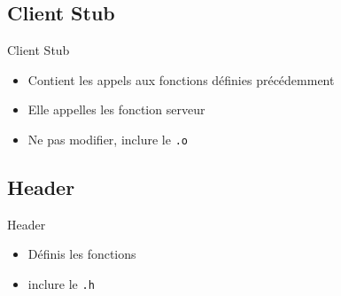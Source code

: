 \subsection{\sectitle}
\begin{frame}[containsverbatim]{\sectitle}
    \def\subsectitle{Client Stub}
    \subsection{\subsectitle}
    \begin{block}{\subsectitle}
        \begin{itemize}
            \item Contient les appels aux fonctions définies précédemment
            \item Elle appelles les fonction serveur
            \item Ne pas modifier, inclure le \verb+.o+
        \end{itemize}
    \end{block}
    \def\subsectitle{Header}
    \subsection{\subsectitle}
    \begin{block}{\subsectitle}
        \begin{itemize}
            \item Définis les fonctions
            \item inclure le \verb+.h+
        \end{itemize}
    \end{block}
\end{frame}


